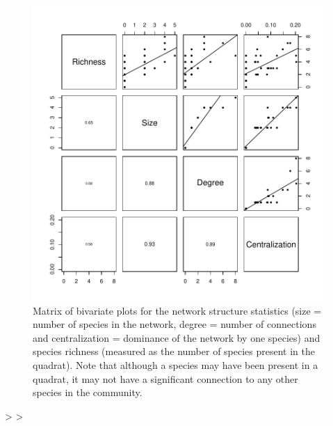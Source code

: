 \documentclass[11pt]{amsart}
\begin{document}
\begin{figure} 
\begin{center} 
\includegraphics{ONC_Lichen_Summary-pairsplot}
\end{center} 
\caption{Matrix of bivariate plots for the network structure
  statistics (size = number of species in the network, degree = number
of connections and centralization = dominance of the network by one
species) and species richness (measured as the number of species
present in the quadrat). Note that although a species may have been
present in a quadrat, it may not have a significant connection to
any other species in the community.}
\label{fig:three}
\end{figure}


\begin{Schunk}
\begin{Sinput}
> 
> 
\end{Sinput}
\end{Schunk}
\end{document}
